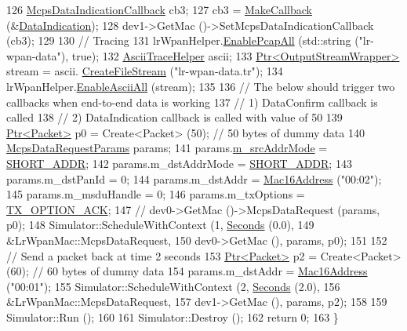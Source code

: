 \begin{DoxyCode}
126   \hyperlink{classns3_1_1Callback}{McpsDataIndicationCallback} cb3;
127   cb3 = \hyperlink{group__makecallbackmemptr_ga9376283685aa99d204048d6a4b7610a4}{MakeCallback} (&\hyperlink{lr-wpan-data_8cc_a910681814411efb730f34de800607624}{DataIndication});
128   dev1->GetMac ()->SetMcpsDataIndicationCallback (cb3);
129 
130   \textcolor{comment}{// Tracing}
131   lrWpanHelper.\hyperlink{classns3_1_1PcapHelperForDevice_a4ab183a2512120200d4a0e5d8ececd49}{EnablePcapAll} (std::string (\textcolor{stringliteral}{"lr-wpan-data"}), \textcolor{keyword}{true});
132   \hyperlink{classns3_1_1AsciiTraceHelper}{AsciiTraceHelper} ascii;
133   \hyperlink{classns3_1_1Ptr}{Ptr<OutputStreamWrapper>} stream = ascii.
      \hyperlink{classns3_1_1AsciiTraceHelper_a44960bf2ca32835024eaedd26d1c4f94}{CreateFileStream} (\textcolor{stringliteral}{"lr-wpan-data.tr"});
134   lrWpanHelper.\hyperlink{classns3_1_1AsciiTraceHelperForDevice_a63e57c878526c732924e14c1e52cca8b}{EnableAsciiAll} (stream);
135 
136   \textcolor{comment}{// The below should trigger two callbacks when end-to-end data is working}
137   \textcolor{comment}{// 1) DataConfirm callback is called}
138   \textcolor{comment}{// 2) DataIndication callback is called with value of 50}
139   \hyperlink{classns3_1_1Ptr}{Ptr<Packet>} p0 = Create<Packet> (50);  \textcolor{comment}{// 50 bytes of dummy data}
140   \hyperlink{structns3_1_1McpsDataRequestParams}{McpsDataRequestParams} params;
141   params.\hyperlink{structns3_1_1McpsDataRequestParams_a31f4c281d07cf3b5992d45416bd71309}{m\_srcAddrMode} = \hyperlink{group__lr-wpan_gga9ea4702ab11d5329e1593afebce06bbba7bf58267dde39bdabfeeb5793450c5e3}{SHORT\_ADDR};
142   params.m\_dstAddrMode = \hyperlink{group__lr-wpan_gga9ea4702ab11d5329e1593afebce06bbba7bf58267dde39bdabfeeb5793450c5e3}{SHORT\_ADDR};
143   params.m\_dstPanId = 0;
144   params.m\_dstAddr = \hyperlink{classns3_1_1Mac16Address}{Mac16Address} (\textcolor{stringliteral}{"00:02"});
145   params.m\_msduHandle = 0;
146   params.m\_txOptions = \hyperlink{group__lr-wpan_gga74ea891230ebf45d80d69a67266930a4a270a37d12b62bb8b5e92d646456244cf}{TX\_OPTION\_ACK};
147 \textcolor{comment}{//  dev0->GetMac ()->McpsDataRequest (params, p0);}
148   Simulator::ScheduleWithContext (1, \hyperlink{group__timecivil_ga33c34b816f8ff6628e33d5c8e9713b9e}{Seconds} (0.0),
149                                   &LrWpanMac::McpsDataRequest,
150                                   dev0->GetMac (), params, p0);
151 
152   \textcolor{comment}{// Send a packet back at time 2 seconds}
153   \hyperlink{classns3_1_1Ptr}{Ptr<Packet>} p2 = Create<Packet> (60);  \textcolor{comment}{// 60 bytes of dummy data}
154   params.m\_dstAddr = \hyperlink{classns3_1_1Mac16Address}{Mac16Address} (\textcolor{stringliteral}{"00:01"});
155   Simulator::ScheduleWithContext (2, \hyperlink{group__timecivil_ga33c34b816f8ff6628e33d5c8e9713b9e}{Seconds} (2.0),
156                                   &LrWpanMac::McpsDataRequest,
157                                   dev1->GetMac (), params, p2);
158 
159   Simulator::Run ();
160 
161   Simulator::Destroy ();
162   \textcolor{keywordflow}{return} 0;
163 \}
\end{DoxyCode}


